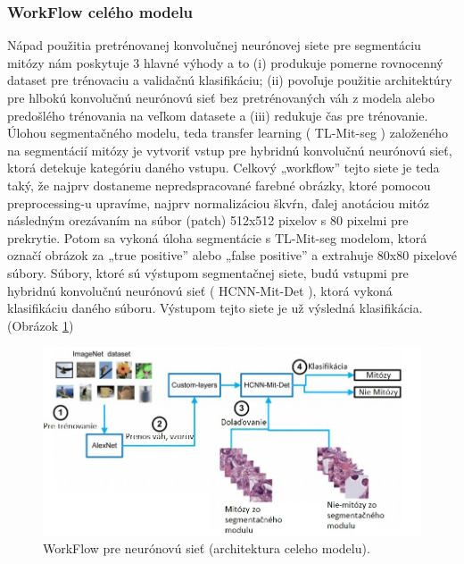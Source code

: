 \subsubsection*{WorkFlow celého modelu}
\hspace{10mm}Nápad použitia pretrénovanej konvolučnej neurónovej siete pre segmentáciu mitózy nám poskytuje 3 hlavné výhody a to (i) produkuje pomerne rovnocenný dataset pre trénovaciu a validačnú klasifikáciu; (ii) povoľuje použitie architektúry pre hlbokú konvolučnú neurónovú sieť bez pretrénovaných váh z modela alebo predošlého trénovania na veľkom datasete a (iii) redukuje čas pre trénovanie. Úlohou segmentačného modelu, teda transfer learning ( TL-Mit-seg ) založeného na segmentácií mitózy je vytvoriť vstup pre hybridnú konvolučnú neurónovú sieť, ktorá detekuje kategóriu daného vstupu. Celkový „workflow”  tejto siete je teda taký, že najprv dostaneme nepredspracované farebné obrázky, ktoré pomocou preprocessing-u upravíme, najprv normalizáciou škvŕn, ďalej anotáciou mitóz následným orezávaním na súbor (patch)  512x512 pixelov s 80 pixelmi pre prekrytie. Potom sa vykoná úloha segmentácie s TL-Mit-seg modelom, ktorá označí obrázok za „true positive” alebo „false positive” a extrahuje 80x80 pixelové súbory. Súbory, ktoré sú výstupom segmentačnej siete, budú vstupmi pre hybridnú konvolučnú neurónovú sieť ( HCNN-Mit-Det ), ktorá vykoná klasifikáciu daného súboru. Výstupom tejto siete je už výsledná klasifikácia. (Obrázok \ref{fig:workflow})
 
\begin{figure}[h!]
\begin{centering}
\includegraphics[width=14cm]{assets/images/253_1.JPG}
\par\end{centering}
\caption{WorkFlow pre neurónovú sieť (architektura celeho modelu). \label{fig:workflow}\cite{10.1093/jmicro/dfz002}}
\end{figure}

